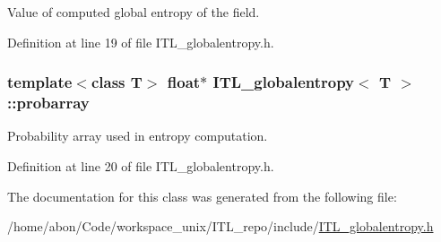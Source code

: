 Value of computed global entropy of the field. 



Definition at line 19 of file ITL\_\-globalentropy.h.

\hypertarget{classITL__globalentropy_a65aa14c47161756fa3dd18b171c232f1}{
\subsubsection[{probarray}]{\setlength{\rightskip}{0pt plus 5cm}template$<$class T$>$ float$\ast$ {\bf ITL\_\-globalentropy}$<$ T $>$::{\bf probarray}}}
\label{classITL__globalentropy_a65aa14c47161756fa3dd18b171c232f1}


Probability array used in entropy computation. 



Definition at line 20 of file ITL\_\-globalentropy.h.



The documentation for this class was generated from the following file:\begin{DoxyCompactItemize}
\item 
/home/abon/Code/workspace\_\-unix/ITL\_\-repo/include/\hyperlink{ITL__globalentropy_8h}{ITL\_\-globalentropy.h}\end{DoxyCompactItemize}
